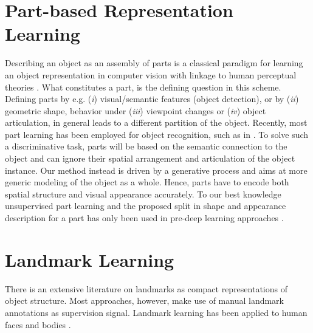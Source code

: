 \section{Part-based Representation Learning}
	Describing an object as an assembly of parts is a classical paradigm for learning an object representation in computer vision \cite{ross06parts} with linkage to human perceptual theories \cite{biederman87recognition}.
	What constitutes a part, is the defining question in this scheme.
	Defining parts by e.g. (\emph{i}) visual/semantic features (object detection), or by (\emph{ii}) geometric shape, behavior under (\emph{iii}) viewpoint changes or (\emph{iv}) object articulation, in general leads to a different partition of the object.
	Recently, most part learning has been employed for object recognition, such as in \cite{felzenszwalb10dpm, novotny17anchornet, singh12patch, mesnil13partssemantic, yang16dpmpose, lam17finerecognize}.
	To solve such a discriminative task, parts will be based on the semantic connection to the object and can ignore their spatial arrangement and articulation of the object instance. Our method instead is driven by a generative process and aims at more generic modeling of the object as a whole. Hence, parts have to encode both spatial structure and visual appearance accurately. To our best knowledge unsupervised part learning and the proposed split in shape and appearance description for a part has only been used in pre-deep learning approaches \cite{ross06parts, nguyen13nonnegative, cootes98activeappear}.


\section{Landmark Learning}
	There is an extensive literature on landmarks as compact representations of object structure.
	Most approaches, however, make use of manual landmark annotations as supervision signal. Landmark learning has been applied to human faces \cite{wu17faceocclu, ranjan16hyperface, yu16deform, zhang16facealign, zhu15facecoarse, zhang14facemultitask, pedersoli14facedeform} and bodies \cite{ionescu11posestructured, toshev14deeppose, pfister15flowingconv, wei16posemachine, newell16hourglass, lim18posetransform, cao17affinityfield}.

